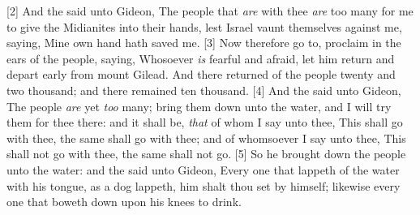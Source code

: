 [2] \textcolor[rgb]{0.00,0.00,1.00}{And the  said unto Gideon, The people that \emph{are} with thee \emph{are} too many for me to give the Midianites into their hands, lest Israel vaunt themselves against me, saying, Mine own hand hath saved me.
[3] \textcolor[rgb]{0.00,0.00,1.00}{Now therefore go to, proclaim in the ears of the people, saying, Whosoever \emph{is} fearful and afraid, let him return and depart early from mount Gilead. And there returned of the people twenty and two thousand; and there remained ten thousand.}%
[4] \textcolor[rgb]{0.00,0.00,1.00}{And the  said unto Gideon, The people \emph{are} yet \emph{too} many; bring them down unto the water, and I will try them for thee there: and it shall be, \emph{that} of whom I say unto thee, This shall go with thee, the same shall go with thee; and of whomsoever I say unto thee, This shall not go with thee, the same shall not go.}%
[5] \textcolor[rgb]{0.00,0.00,1.00}{So he brought down the people unto the water: and the  said unto Gideon, Every one that lappeth of the water with his tongue, as a dog lappeth, him shalt thou set by himself; likewise every one that boweth down upon his knees to drink.}\\
}
